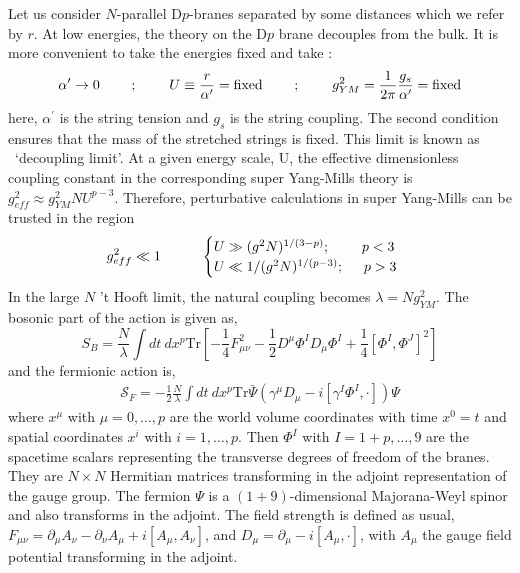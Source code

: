 Let us consider $N$-parallel D$p$-branes separated by some distances which we refer by $r$. At 
low energies, the theory on the D$p$ brane decouples from the bulk. It is more convenient to
take the energies fixed and take :
\[ \alpha^{\prime} \rightarrow 0  \hspace{8mm} ; \hspace{8mm} U \equiv \frac{r}{\alpha^{\prime}} = \text{fixed} \hspace{8mm}
; \hspace{8mm} g^{2}_{YM} = \frac{1}{2\pi} \frac{g_{s}}{\alpha^{\prime}} = \text{fixed}   \]
here, $\alpha^{\prime}$ is the string tension and $g_{s}$ is the string coupling. The 
second condition ensures that the mass of the stretched strings is fixed. This limit is known as ~`decoupling limit'.  
At a given energy scale, U, the effective dimensionless coupling constant in 
the corresponding super Yang-Mills theory is $ g_{eff}^{2} \approx g_{YM}^{2} NU^{p-3}$. 
Therefore, perturbative calculations in super Yang-Mills can be trusted in the region 
\begin{equation}
 g^2_{eff} \ll 1 \hspace{10mm} \begin{cases}
     U\gg (g^2 N)^{1/(3-p)} ; \hspace{8mm}p<3     \\
    U \ll 1/(g^2 N)^{1/(p-3)} ; \hspace{5mm} p>3  
      \end{cases}
    \end{equation} 
In the large $N$ 't Hooft limit, the natural coupling becomes $ \lambda = N g_{YM}^{2}$. The bosonic part of the action is given as,
\begin{equation}
S_{B} = \frac{N}{\lambda}  \int dt ~ dx^p \mathrm{Tr}\left[  - \frac{1}{4} F_{\mu\nu}^2 - \frac{1}{2} D^\mu \Phi^I D_\mu \Phi^I + \frac{1}{4} \left[ \Phi^I , \Phi^J \right]^2  \right]
\end{equation}
and the fermionic action is,
\begin{eqnarray}
\mathcal{S}_{F} = -\frac{1}{2} \frac{N}{\lambda} \int dt ~ dx^p \mathrm{Tr} \bar{\Psi} \left( \gamma^\mu D_\mu - i  \left[ \gamma^I \Phi^I , \cdot \right] \right) \Psi
\end{eqnarray}
where $x^\mu$ with $\mu = 0, \ldots, p$ are the world volume coordinates with time $x^0 = t$ and 
spatial coordinates $x^i$ with $i=1,\ldots,p$. Then $\Phi^I$ with $I = 1+p, \ldots, 9$ are the spacetime 
scalars representing the transverse degrees of freedom of the branes. They are $N \times N$ Hermitian 
matrices transforming in the adjoint representation of the gauge group. The fermion $\Psi$ is a $(1+9)$-dimensional 
Majorana-Weyl spinor and also transforms in the adjoint. 
The field strength is defined as usual, $F_{\mu\nu} = \partial_\mu A_\nu - \partial_\nu A_\mu + i [ A_\mu , A_\nu ]$, and $D_\mu = \partial_\mu - i [ A_\mu, \cdot]$, with $A_\mu$ 
the gauge field potential transforming in the adjoint. 

